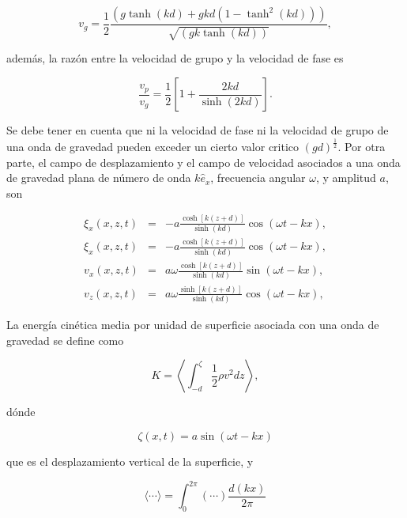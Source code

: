 \begin{equation}\label{eq231}
   v_g = \frac{1}{2}\frac{(g\tanh(kd)+gkd(1-\tanh^2(kd)))}{\sqrt{(gk\tanh(kd))}},
\end{equation}

\noindent además, la razón entre la velocidad de grupo y la velocidad de fase es

\begin{equation}\label{eq232}
   \frac{v_p}{v_g} = \frac{1}{2} \left[1 + \frac{2kd}{\sinh(2kd)}\right].
\end{equation}

Se debe tener en cuenta que ni la velocidad de fase ni la velocidad de grupo de una onda de gravedad pueden exceder un cierto valor critico $(gd)^{\frac{1}{2}}$. Por otra parte, el campo de desplazamiento y el campo de velocidad asociados a una onda de gravedad plana de número de onda $k\hat{e}_x$, frecuencia angular $\omega$, y amplitud $a$, son

\begin{eqnarray}
   \xi_x(x,z,t)& = & -a \frac{\cosh[k(z+d)]}{\sinh(kd)}\cos(\omega t - kx),\label{eq233}\\
   \xi_x(x,z,t)& = & -a \frac{\cosh[k(z+d)]}{\sinh(kd)}\cos(\omega t - kx),\label{eq234}\\
   v_x(x,z,t) & = & a \omega \frac{\cosh[k(z+d)]}{\sinh(kd)}\sin(\omega t - kx),\label{eq235}\\
   v_z(x,z,t) & = & a \omega \frac{\sinh[k(z+d)]}{\sinh(kd)}\cos(\omega t - kx),\label{eq236}
\end{eqnarray}

\noindent La energía cinética media por unidad de superficie asociada con una onda de gravedad se define como

\begin{equation}\label{eq237}
      K = \left\langle \int_{- d}^\zeta \frac{1}{2} \rho v^{2}dz \right\rangle,
\end{equation} 

\noindent dónde

\begin{equation}\label{eq238}
   \zeta(x, t) = a \sin(\omega t -kx)
\end{equation}

\noindent que es el desplazamiento vertical de la superficie, y

\begin{equation}\label{eq239}
   \langle \cdots \rangle = \int_0^{2\pi}(\cdots) \frac{d(kx)}{2\pi}
\end{equation}


